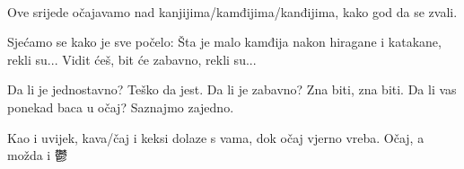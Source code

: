 \documentclass{grampig}
\begin{document}
	\onehalfspacing
	\obeylines
	{\Large {}} \\[-0.5em]
	
	Ove srijede očajavamo nad kanjijima/kamđijima/kanđijima, kako god da se zvali. \\[-1em]
	
	\begin{center}
		Sjećamo se kako je sve počelo:
		Šta je malo kamđija nakon hiragane i katakane, rekli su...
		Vidit ćeš, bit će zabavno, rekli su...
	\end{center}\vspace{0.5em}
	
	\begin{center}
		Da li je jednostavno? Teško da jest. 
		Da li je zabavno? Zna biti, zna biti. 
		Da li vas ponekad baca u očaj? Saznajmo zajedno. 
	\end{center}\vspace{0.5em}
	
	Kao i uvijek, kava/čaj i keksi dolaze s vama, dok očaj vjerno vreba. Očaj, a možda i 鬱 \\[-1em]
	
	\begin{center}
	\end{center}
\end{document}
